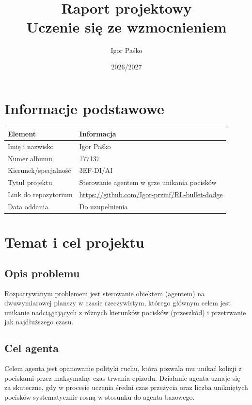 \documentclass[12pt]{article}
\title{Raport projektowy\\Uczenie się ze wzmocnieniem}
\author{Igor Paśko}
\date{2026/2027}
\begin{document}
\maketitle
\tableofcontents
\newpage

\section{Informacje podstawowe}

\begin{center}
\begin{tabular}{p{}p{}}
\toprule
Element & Informacja \\
\midrule
Imię i nazwisko & Igor Paśko \\
Numer albumu & 177137 \\
Kierunek/specjalność & 3EF-DI/AI \\
Tytuł projektu & Sterowanie agentem w grze unikania pocisków \\
Link do repozytorium & \url{https://github.com/Igor-przinf/RL-bullet-dodge} \\
Data oddania & Do uzupełnienia \\
\bottomrule
\end{tabular}
\end{center}

\section{Temat i cel projektu}

\subsection{Opis problemu}
Rozpatrywanym problemem jest sterowanie obiektem (agentem) na dwuwymiarowej planszy w czasie rzeczywistym, którego głównym celem jest unikanie nadciągających z różnych kierunków pocisków (przeszkód) i przetrwanie jak najdłuższego czasu.

\subsection{Cel agenta}
Celem agenta jest opanowanie polityki ruchu, która pozwala mu unikać kolizji z pociskami przez maksymalny czas trwania epizodu. Działanie agenta uznaje się za skuteczne, gdy w procesie uczenia średni czas przeżycia oraz liczba unikniętych pocisków systematycznie rosną w stosunku do agenta bazowego.
\end{document}

